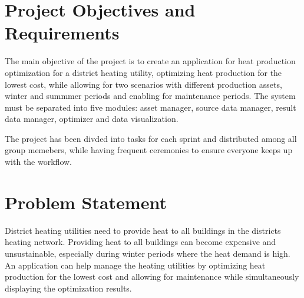 

\section{Project Objectives and Requirements}


The main objective of the project is to create an application for heat production optimization for a district heating utility,
optimizing heat production for the lowest cost, 
while allowing for two scenarios with different production assets, winter and summmer periods and enabling for maintenance periods.
The system must be separated into five modules: asset manager, source data manager, result data manager, optimizer and data visualization. 

The project has been divded into tasks for each sprint and distributed among all group memebers,
while having frequent ceremonies to ensure everyone keeps up with the workflow.


\section{Problem Statement}


District heating utilities need to provide heat to all buildings in the districts heating network.
Providing heat to all buildings can become expensive and unsustainable, especially during winter periods where the heat demand is high.
An application can help manage the heating utilities by optimizing heat production for the lowest cost
and allowing for maintenance while simultaneously displaying the optimization results.